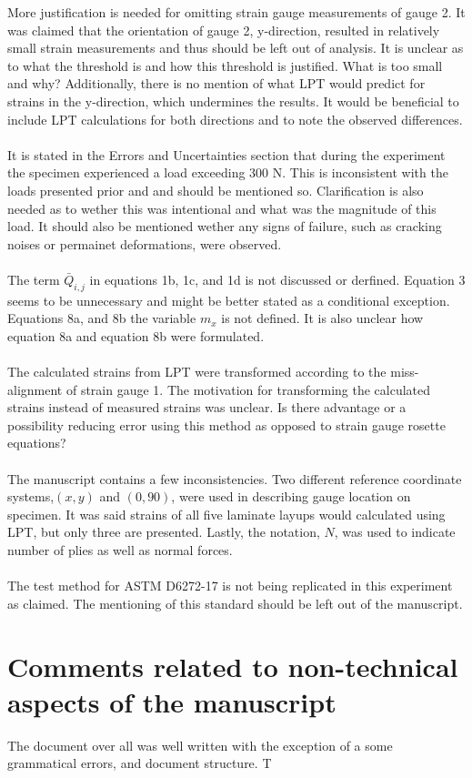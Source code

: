 \documentclass[12pt]{article}
\begin{document}
More justification is needed for omitting strain gauge measurements of gauge 2.  It was claimed that the orientation of gauge 2, y-direction, resulted in relatively small strain measurements and thus should be left out of analysis. It is unclear as to what the threshold is and how this threshold is justified. What is too small and why? Additionally, there is no mention of what LPT would predict for strains in the y-direction, which undermines the results.  It would be beneficial to  include LPT calculations for both directions and to note the observed differences.
\\
\\
It is stated in the Errors and Uncertainties section that during the experiment the specimen experienced a load exceeding 300 N. This is inconsistent with the loads presented prior and and should be mentioned so. Clarification is also needed as to wether this was intentional and what was the magnitude of this load. It should also be mentioned wether any signs of failure, such as cracking noises or permainet deformations, were observed.
\\
\\
The term $\bar Q_{i,j}$ in equations 1b, 1c, and 1d is not discussed or derfined. Equation 3 seems to be unnecessary and might be better stated as a conditional exception. Equations 8a, and 8b  the variable $m_x$ is not defined.  It is also unclear how equation 8a and equation 8b  were formulated.
\\
\\
The calculated strains from LPT were transformed according to the miss-alignment of strain gauge 1. The motivation for transforming the calculated strains instead of measured strains was unclear.  Is there advantage or a possibility reducing error using this method as opposed to strain gauge rosette equations?
\\
\\
The manuscript contains a few inconsistencies.  Two different reference coordinate systems,$(x,y)$ and $(0,90)$, were used in describing  gauge location on specimen. It was said strains of all five laminate layups would calculated using LPT, but only three are presented. Lastly, the notation, $N$, was used to indicate number of plies as well as normal forces.
\\
\\
The test method for ASTM D6272-17 is not being replicated in this experiment as claimed. The mentioning of this standard should be left out of the manuscript.  
\section{Comments related to non-technical aspects of the manuscript} 
The document over all was well written with the exception of a some grammatical errors, and document structure.  T
\end{document}
